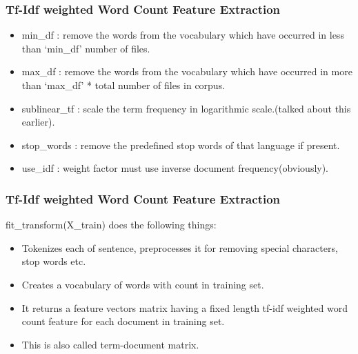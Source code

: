         

\begin{frame}[fragile]\frametitle{Tf-Idf weighted Word Count Feature Extraction}
  \begin{itemize}
  \item  min\_df : remove the words from the vocabulary which have occurred in less than `min\_df' number of files.
  \item      max\_df : remove the words from the vocabulary which have occurred in more than `max\_df' * total number of files in corpus.
  \item      sublinear\_tf : scale the term frequency in logarithmic scale.(talked about this earlier).
  \item      stop\_words : remove the predefined stop words of that language if present.
  \item      use\_idf : weight factor must use inverse document frequency(obviously).

  \end{itemize}
\end{frame}


\begin{frame}[fragile]\frametitle{Tf-Idf weighted Word Count Feature Extraction}
fit\_transform(X\_train) does the following things:
  \begin{itemize}
  \item  Tokenizes each of sentence, preprocesses it for removing special characters, stop words etc. 
\item Creates a vocabulary of words with count in training set. %
\item It returns a feature vectors matrix having a fixed length tf-idf weighted word count feature for each document in training set. 
\item This is also called term-document matrix.
  \end{itemize}
\end{frame}

